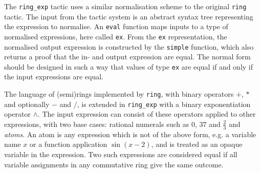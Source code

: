\documentclass{llncs}
\newcommand{\lean}[1]{\texttt{#1}\xspace} %
\newcommand{\pow}{$\wedge$\xspace}
\newcommand{\ring}{\lean{ring}}
\newcommand{\ringexp}{\lean{ring\_exp}}
\begin{document}
The \ringexp tactic uses a similar normalisation scheme to the original \ring tactic.
The input from the tactic system is an abstract syntax tree representing the expression to normalise.
An \lean{eval} function maps inputs to a type of normalised expressions, here called \lean{ex}.
From the \lean{ex} representation, the normalised output expression is constructed by the \lean{simple} function,
which also returns a proof that the in- and output expression are equal.
The normal form should be designed in such a way that values of type \lean{ex} are equal if and only if the input expressions are equal.

The language of (semi)rings implemented by \ring, with binary operators $+$, $*$ and optionally $-$ and $/$,
is extended in \ringexp with a binary exponentiation operator \pow.
The input expression can consist of these operators applied to other expressions,
with two base cases: rational numerals such as $0$, $37$ and $\frac{2}{3}$ and \emph{atoms}.
An atom is any expression which is not of the above form, e.g. a variable name $x$ or a function application $\sin (x - 2)$,
and is treated as an opaque variable in the expression.
Two such expressions are considered equal if all variable assignments in any commutative ring give the same outcome.

\end{document}
